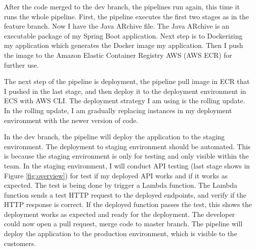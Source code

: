 \par
After the code merged to the dev branch, the pipelines run again, this time it runs the whole pipeline. First, the pipeline executes the first two stages as in the feature branch. Now I have the Java ARchive file. The Java ARchive is an executable package of my Spring Boot application. Next step is to Dockerizing my application which generates the Docker image my application. Then I push the image to the Amazon Elastic Container Registry AWS (AWS ECR) for further use.
\par
\label{deploy}
The next step of the pipeline is deployment, the pipeline pull image in ECR that I pushed in the last stage, and then deploy it to the deployment environment in ECS with AWS CLI. The deployment strategy I am using is the rolling update. In the rolling update, I am gradually replacing instances in my deployment environment with the newer version of code.
\par
In the dev branch, the pipeline will deploy the application to the staging environment. The deployment to staging environment should be automated. This is because the staging environment is only for testing and only visible within the team. 
In the staging environment, I will conduct API testing (last stage shows in Figure \ref{fig:overview}) for test if my deployed API works and if it works as expected. The test is being done by trigger a Lambda function. The Lambda function sends a test HTTP request to the deployed endpoints, and verify if the HTTP response is correct. If the deployed function passes the test, this shows the deployment works as expected and ready for the deployment. The developer could now open a pull request, merge code to master branch. The pipeline will deploy the application to the production environment, which is visible to the customers.
